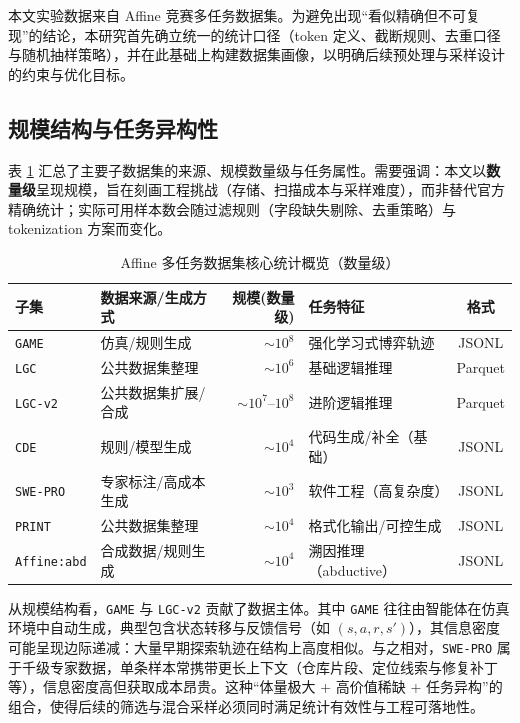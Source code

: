 \documentclass[UTF8]{article}
\begin{document}
本文实验数据来自 Affine 竞赛多任务数据集。为避免出现“看似精确但不可复现”的结论，本研究首先确立统一的统计口径（token 定义、截断规则、去重口径与随机抽样策略），并在此基础上构建数据集画像，以明确后续预处理与采样设计的约束与优化目标。

\subsection{规模结构与任务异构性}\label{sec:scale_heterogeneity}

表 \ref{tab:dataset_info} 汇总了主要子数据集的来源、规模数量级与任务属性。需要强调：本文以\textbf{数量级}呈现规模，旨在刻画工程挑战（存储、扫描成本与采样难度），而非替代官方精确统计；实际可用样本数会随过滤规则（字段缺失剔除、去重策略）与 tokenization 方案而变化。

\begin{table}[H]
\centering
\caption{Affine 多任务数据集核心统计概览（数量级）}
\label{tab:dataset_info}
\begin{tabular}{llrlc}
\toprule
\textbf{子集} & \textbf{数据来源/生成方式} & \textbf{规模(数量级)} & \textbf{任务特征} & \textbf{格式} \\
\midrule
\texttt{GAME} & 仿真/规则生成 & $\sim 10^8$ & 强化学习式博弈轨迹 & JSONL \\
\texttt{LGC} & 公共数据集整理 & $\sim 10^6$ & 基础逻辑推理 & Parquet \\
\texttt{LGC-v2} & 公共数据集扩展/合成 & $\sim 10^7$--$10^8$ & 进阶逻辑推理 & Parquet \\
\texttt{CDE} & 规则/模型生成 & $\sim 10^4$ & 代码生成/补全（基础） & JSONL \\
\texttt{SWE-PRO} & 专家标注/高成本生成 & $\sim 10^3$ & 软件工程（高复杂度） & JSONL \\
\texttt{PRINT} & 公共数据集整理 & $\sim 10^4$ & 格式化输出/可控生成 & JSONL \\
\texttt{Affine:abd} & 合成数据/规则生成 & $\sim 10^4$ & 溯因推理（abductive） & JSONL \\
\bottomrule
\end{tabular}
\end{table}

从规模结构看，\texttt{GAME} 与 \texttt{LGC-v2} 贡献了数据主体。其中 \texttt{GAME} 往往由智能体在仿真环境中自动生成，典型包含状态转移与反馈信号（如 $(s,a,r,s')$），其信息密度可能呈现边际递减：大量早期探索轨迹在结构上高度相似。与之相对，\texttt{SWE-PRO} 属于千级专家数据，单条样本常携带更长上下文（仓库片段、定位线索与修复补丁等），信息密度高但获取成本昂贵。这种“体量极大 + 高价值稀缺 + 任务异构”的组合，使得后续的筛选与混合采样必须同时满足统计有效性与工程可落地性。
\end{document}
